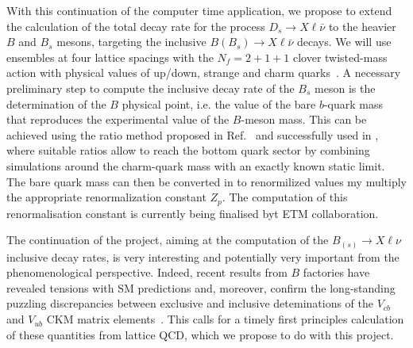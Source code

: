 With this continuation of the computer time application, we propose to extend
the calculation of the total decay rate for the process $D_s \to X\ell\bar\nu$ to the
heavier $B$ and $B_s$ mesons, targeting the inclusive $B (B_s) \to
X\ell\bar\nu$ decays.
We will use ensembles at four lattice spacings with the $N_f=2+1+1$ clover twisted-mass action with physical 
values of up/down, strange and charm
quarks~\cite{ExtendedTwistedMass:2021qui,ExtendedTwistedMass:2021gbo,ExtendedTwistedMass:2022jpw}. 
A necessary preliminary step to compute the inclusive decay rate of the $B_s$
meson is the determination of the
$B$ physical point, i.e. the value of the bare $b$-quark mass that reproduces the
experimental value of the $B$-meson mass.
This can be
achieved using the ratio method proposed in Ref.~\cite{ETM:2009sed}
and successfully used in \cite{ETM:2016nbo}, where suitable ratios allow
to reach the bottom quark sector by combining simulations around the
charm-quark mass with an exactly known static limit.
The bare quark mass can then be converted in to renormilized values my multiply
the appropriate renormalization constant $Z_p$. The computation of
this renormalisation constant is currently being finalised byt ETM collaboration.


The continuation of the project, aiming at the computation of the $B_{(s)}\to X \ell\nu$
inclusive decay rates, is very interesting and potentially very important from
the phenomenological perspective. Indeed, recent results from $B$
factories have revealed tensions with SM predictions and, moreover,
confirm the long-standing puzzling discrepancies between exclusive and
inclusive deteminations of the $V_{cb}$ and $V_{ub}$ CKM matrix
elements~\cite{ParticleDataGroup:2022pth,HFLAV:2022esi,Gambino:2019sif}. This
calls for a timely first principles calculation of these quantities
from lattice QCD, which we propose to do with this project.
